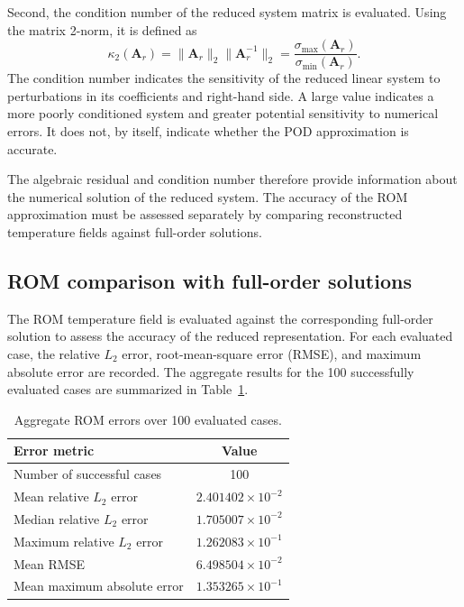 Second, the condition number of the reduced system
matrix is evaluated. Using the matrix 2-norm, it is
defined as
\begin{equation}
    \boxed{
    \kappa_2(\mathbf{A}_r)
    =
    \|\mathbf{A}_r\|_2
    \|\mathbf{A}_r^{-1}\|_2
    =
    \frac{\sigma_{\max}(\mathbf{A}_r)}
    {\sigma_{\min}(\mathbf{A}_r)}.
    }
    \label{eq:rom_condition_number}
\end{equation}
The condition number indicates the sensitivity of the
reduced linear system to perturbations in its
coefficients and right-hand side. A large value
indicates a more poorly conditioned system and greater
potential sensitivity to numerical errors. It does not,
by itself, indicate whether the POD approximation is
accurate.

The algebraic residual and condition number therefore
provide information about the numerical solution of
the reduced system. The accuracy of the ROM approximation
must be assessed separately by comparing reconstructed
temperature fields against full-order solutions.

\subsection{ROM comparison with full-order solutions}

The ROM temperature field is evaluated against the
corresponding full-order solution to assess the accuracy
of the reduced representation. For each evaluated case,
the relative $L_2$ error, root-mean-square error (RMSE),
and maximum absolute error are recorded. The aggregate
results for the 100 successfully evaluated cases are
summarized in Table~\ref{tab:rom_validation_errors}.

\begin{table}[htbp]
    \centering
    \caption{Aggregate ROM errors over 100 evaluated cases.}
    \label{tab:rom_validation_errors}
    \begin{tabular}{lc}
        \toprule
        \textbf{Error metric} & \textbf{Value} \\
        \midrule
        Number of successful cases & 100 \\
        Mean relative $L_2$ error & $2.401402\times10^{-2}$ \\
        Median relative $L_2$ error & $1.705007\times10^{-2}$ \\
        Maximum relative $L_2$ error & $1.262083\times10^{-1}$ \\
        Mean RMSE & $6.498504\times10^{-2}$ \\
        Mean maximum absolute error & $1.353265\times10^{-1}$ \\
        \bottomrule
    \end{tabular}
\end{table}

